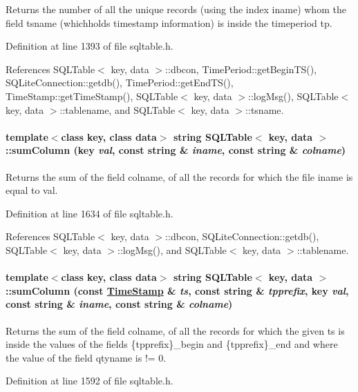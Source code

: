 Returns the number of all the unique records (using the index iname) whom the field tsname (whichholds timestamp information) is inside the timeperiod tp. 

Definition at line 1393 of file sqltable.h.

References SQLTable$<$ key, data $>$::dbcon, Time\-Period::get\-Begin\-TS(), SQLite\-Connection::getdb(), Time\-Period::get\-End\-TS(), Time\-Stamp::get\-Time\-Stamp(), SQLTable$<$ key, data $>$::log\-Msg(), SQLTable$<$ key, data $>$::tablename, and SQLTable$<$ key, data $>$::tsname.\hypertarget{classSQLTable_SQLTablea35}{
\paragraph[sumColumn]{\setlength{\rightskip}{0pt plus 5cm}template$<$class key, class data$>$ string SQLTable$<$ key, data $>$::sum\-Column (key {\em val}, const string \& {\em iname}, const string \& {\em colname})}\hfill}
\label{classSQLTable_SQLTablea35}


Returns the sum of the field colname, of all the records for which the file iname is equal to val. 

Definition at line 1634 of file sqltable.h.

References SQLTable$<$ key, data $>$::dbcon, SQLite\-Connection::getdb(), SQLTable$<$ key, data $>$::log\-Msg(), and SQLTable$<$ key, data $>$::tablename.\hypertarget{classSQLTable_SQLTablea34}{
\paragraph[sumColumn]{\setlength{\rightskip}{0pt plus 5cm}template$<$class key, class data$>$ string SQLTable$<$ key, data $>$::sum\-Column (const \hyperlink{classTimeStamp}{Time\-Stamp} \& {\em ts}, const string \& {\em tpprefix}, key {\em val}, const string \& {\em iname}, const string \& {\em colname})}\hfill}
\label{classSQLTable_SQLTablea34}


Returns the sum of the field colname, of all the records for which the given ts  is inside the values of the fields \{tpprefix\}\_\-begin and \{tpprefix\}\_\-end and where the value of the field qtyname is != 0. 

Definition at line 1592 of file sqltable.h.

